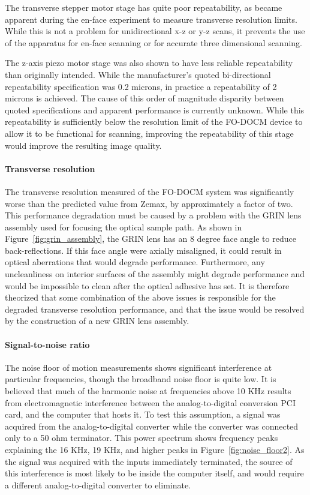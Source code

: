 The transverse stepper motor stage has quite poor repeatability, as became apparent during the en-face experiment to measure transverse resolution limits. While this is not a problem for unidirectional x-z or y-z scans, it prevents the use of the apparatus for en-face scanning or for accurate three dimensional scanning.

The z-axis piezo motor stage was also shown to have less reliable repeatability than originally intended. While the manufacturer's quoted bi-directional repeatability specification was 0.2 microns, in practice a repeatability of 2 microns is achieved. The cause of this order of magnitude disparity between quoted specifications and apparent performance is currently unknown. While this repeatability is sufficiently below the resolution limit of the FO-DOCM device to allow it to be functional for scanning, improving the repeatability of this stage would improve the resulting image quality.

\paragraph{Transverse resolution}

The transverse resolution measured of the FO-DOCM system was significantly worse than the predicted value from Zemax, by approximately a factor of two. This performance degradation must be caused by a problem with the GRIN lens assembly used for focusing the optical sample path. As shown in Figure~\ref{fig:grin_assembly}, the GRIN lens has an 8 degree face angle to reduce back-reflections. If this face angle were axially misaligned, it could result in optical aberrations that would degrade performance. Furthermore, any uncleanliness on interior surfaces of the assembly might degrade performance and would be impossible to clean after the optical adhesive has set. It is therefore theorized that some combination of the above issues is responsible for the degraded transverse resolution performance, and that the issue would be resolved by the construction of a new GRIN lens assembly.

\paragraph{Signal-to-noise ratio}

The noise floor of motion measurements shows significant interference at particular frequencies, though the broadband noise floor is quite low. It is believed that much of the harmonic noise at frequencies above 10 KHz results from electromagnetic interference between the analog-to-digital conversion PCI card, and the computer that hosts it. To test this assumption, a signal was acquired from the analog-to-digital converter while the converter was connected only to a 50 ohm terminator. This power spectrum shows frequency peaks explaining the 16 KHz, 19 KHz, and higher peaks in Figure~\ref{fig:noise_floor2}. As the signal was acquired with the inputs immediately terminated, the source of this interference is most likely to be inside the computer itself, and would require a different analog-to-digital converter to eliminate. %

